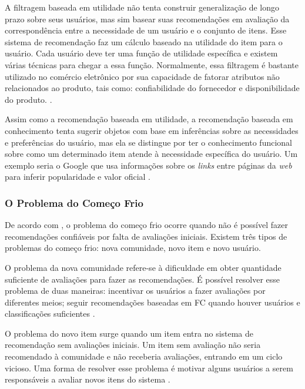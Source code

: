 
A filtragem baseada em utilidade não tenta construir generalização de longo prazo sobre seus usuários, mas sim basear suas recomendações 
em avaliação da correspondência entre a necessidade de um usuário e o conjunto de itens.
Esse sistema de recomendação faz um cálculo baseado na utilidade do item para o usuário.
Cada usuário deve ter uma função de utilidade específica e existem várias técnicas para chegar a essa função. Normalmente, 
essa filtragem é bastante utilizado no comércio eletrônico por sua capacidade de fatorar atributos não 
relacionados ao produto, tais como:
confiabilidade do fornecedor e disponibilidade do produto. \cite{burke2002}.


Assim como a recomendação baseada em utilidade, a recomendação baseada em conhecimento tenta sugerir objetos com base em inferências
sobre as necessidades e preferências do usuário, mas ela se distingue por ter o conhecimento funcional sobre 
como um determinado item atende à necessidade específica do usuário. Um exemplo seria 
o Google que usa informações sobre os \emph{links} entre páginas da \emph{web} para inferir popularidade e valor oficial \cite{burke2002}.


\subsubsection{O Problema do Começo Frio}

De acordo com , o problema do começo frio ocorre quando não é possível fazer recomendações 
confiáveis por falta de avaliações iniciais. Existem três tipos de problemas do começo frio: nova comunidade, novo item e novo usuário. 

O problema da nova comunidade refere-se à dificuldade em obter quantidade suficiente de avaliações para fazer as recomendações. É possível 
resolver esse problema de duas maneiras: incentivar os usuários a fazer avaliações por diferentes meios; seguir recomendações baseadas em FC 
quando houver usuários e classificações suficientes \cite{bobadilla2013}.

O problema do novo item surge quando um item entra no sistema de recomendação sem avaliações iniciais. 
Um item sem avaliação não seria recomendado à comunidade e não receberia avaliações, entrando em um ciclo vicioso. Uma forma 
de resolver esse problema é motivar alguns usuários a serem responsáveis a avaliar novos itens do sistema \cite{burke2002}. 

